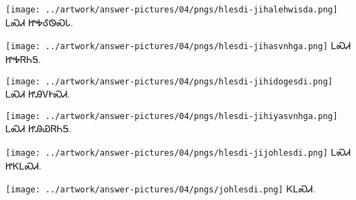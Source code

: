 \documentclass[avery5371,frame]{flashcards}%
\begin{document}
\begin{flashcard}{
\texttt{[image: ../artwork/answer-pictures/04/pngs/hlesdi-jihalehwisda.png]}
}\Huge ᏞᏍᏗ ᏥᎭᎴᏫᏍᏓ.
\end{flashcard}

\begin{flashcard}{
\texttt{[image: ../artwork/answer-pictures/04/pngs/hlesdi-jihasvnhga.png]}
}\Huge ᏞᏍᏗ ᏥᎭᏒᏂᎦ.
\end{flashcard}

\begin{flashcard}{
\texttt{[image: ../artwork/answer-pictures/04/pngs/hlesdi-jihidogesdi.png]}
}\Huge ᏞᏍᏗ ᏥᎯᏙᎨᏍᏗ.
\end{flashcard}

\begin{flashcard}{
\texttt{[image: ../artwork/answer-pictures/04/pngs/hlesdi-jihiyasvnhga.png]}
}\Huge ᏞᏍᏗ ᏥᎯᏯᏒᏂᎦ.
\end{flashcard}

\begin{flashcard}{
\texttt{[image: ../artwork/answer-pictures/04/pngs/hlesdi-jijohlesdi.png]}
}\Huge ᏞᏍᏗ ᏥᏦᏞᏍᏗ.
\end{flashcard}

\begin{flashcard}{
\texttt{[image: ../artwork/answer-pictures/04/pngs/johlesdi.png]}
}\Huge ᏦᏞᏍᏗ.
\end{flashcard}
\end{document}
